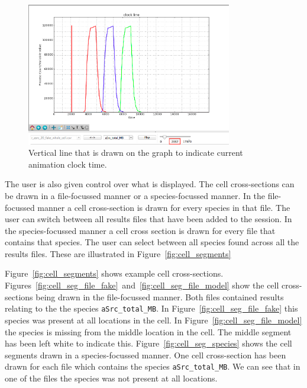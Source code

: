 \begin{figure}[h!]
    \centering
    \includegraphics[width=0.8\textwidth]{images/animation_clock_line.png}
    \caption{Vertical line that is drawn on the graph to indicate current animation clock time.}
    \label{fig:animation_clock}
\end{figure}

The user is also given control over what is displayed.  The cell cross-sections can be drawn in a file-focussed manner or a species-focussed manner.  In the file-focussed manner a cell cross-section is drawn for every species in that file.  The user can switch between all results files that have been added to the session.  In the species-focussed manner a cell cross section is drawn for every file that contains that species.  The user can select between all species found across all the results files.  These are illustrated in Figure~\ref{fig:cell_segments}

Figure~\ref{fig:cell_segments} shows example cell cross-sections.  Figures~\ref{fig:cell_seg_file_fake}~and~\ref{fig:cell_seg_file_model} show the cell cross-sections being drawn in the file-focussed manner.  Both files contained results relating to the the species \texttt{aSrc\_total\_MB}. In Figure~\ref{fig:cell_seg_file_fake} this species was present at all locations in the cell.  In Figure~\ref{fig:cell_seg_file_model} the species is missing from the middle location in the cell.  The middle segment has been left white to indicate this.  Figure~\ref{fig:cell_seg_species} shows the cell segments drawn in a species-focussed manner.  One cell cross-section has been drawn for each file which contains the species \texttt{aSrc\_total\_MB}.  We can see that in one of the files the species was not present at all locations.

